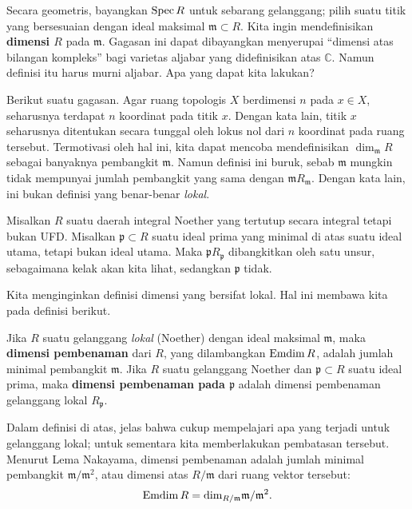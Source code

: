 Secara geometris, bayangkan $\operatorname{Spec} R$ untuk sebarang gelanggang; pilih suatu titik yang bersesuaian dengan ideal
maksimal $\mathfrak{m} \subset R$. Kita ingin mendefinisikan \textbf{dimensi $R$}
pada $\mathfrak{m}$. Gagasan ini dapat dibayangkan menyerupai ``dimensi atas
bilangan kompleks'' bagi varietas aljabar yang didefinisikan atas $\mathbb{C}$. Namun definisi itu
harus murni aljabar. 
Apa yang dapat kita lakukan?


Berikut suatu gagasan. Agar ruang topologis $X$ berdimensi $n$ pada $x \in
X$, seharusnya terdapat $n$ koordinat pada titik $x$. Dengan kata lain,
titik $x$ seharusnya ditentukan secara tunggal
oleh lokus nol dari $n$ koordinat pada ruang tersebut.
Termotivasi oleh hal ini, kita dapat mencoba mendefinisikan $\dim_{\mathfrak{m}} R$
sebagai banyaknya pembangkit $\mathfrak{m}$.
Namun definisi ini buruk, sebab $\mathfrak{m}$ mungkin tidak mempunyai jumlah
pembangkit yang sama dengan $\mathfrak{m}R_{\mathfrak{m}}$. Dengan kata lain, ini bukan definisi yang benar-benar
\emph{lokal}.
\begin{example} 
Misalkan $R$ suatu daerah integral Noether yang tertutup secara integral tetapi bukan UFD. Misalkan $\mathfrak{p}
\subset R$ suatu ideal prima yang minimal di atas suatu ideal utama, tetapi
bukan ideal utama. Maka $\mathfrak{p}R_{\mathfrak{p}}$ dibangkitkan oleh
satu unsur, sebagaimana kelak akan kita lihat, sedangkan $\mathfrak{p}$ tidak.
\end{example} 

Kita menginginkan definisi dimensi yang bersifat
lokal.
Hal ini membawa kita pada definisi berikut.
\begin{definition} 
Jika $R$ suatu gelanggang \emph{lokal} (Noether) dengan ideal maksimal $\mathfrak{m}$,
maka \textbf{dimensi pembenaman} dari $R$, yang dilambangkan $\operatorname{Emdim} R$, adalah
jumlah minimal pembangkit $\mathfrak{m}$. Jika $R$ suatu gelanggang
Noether dan $\mathfrak{p} \subset R$ suatu ideal prima, maka \textbf{dimensi pembenaman
pada $\mathfrak{p}$} adalah dimensi pembenaman gelanggang lokal $R_{\mathfrak{p}}$.
\end{definition} 

Dalam definisi di atas, jelas bahwa cukup mempelajari apa yang terjadi untuk
gelanggang lokal; untuk sementara kita memberlakukan pembatasan tersebut. Menurut Lema Nakayama,
dimensi pembenaman adalah jumlah minimal pembangkit
$\mathfrak{m}/\mathfrak{m}^2$, atau dimensi atas $R/\mathfrak{m}$ dari ruang vektor
tersebut:
\[ \operatorname{Emdim} R = \mathrm{dim}_{R/\mathfrak{m}} \mathfrak{m}/ \mathfrak{m}^2.  \]


